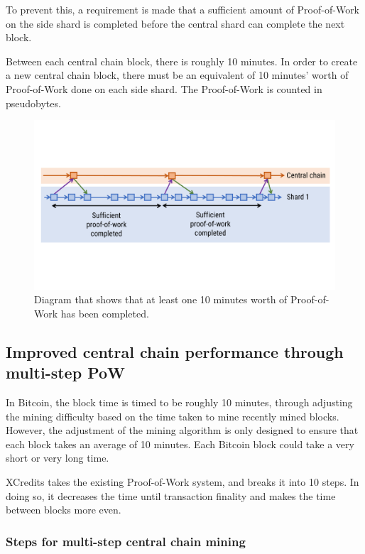 \documentclass[a4paper,12pt]{article}
\begin{document}
To prevent this, a requirement is made that a sufficient amount of Proof-of-Work on the side shard is completed before the central shard can complete the next block. 



Between each central chain block, there is roughly 10 minutes. In order to create a new central chain block, there must be an equivalent of 10 minutes' worth of Proof-of-Work done on each side shard. The Proof-of-Work is counted in pseudobytes. 

\begin{figure}[!htb]
  \centering
  \includegraphics[page=1,width=.95\textwidth]{side-shard-Proof-of-Work} 
  \caption{Diagram that shows that at least one 10 minutes worth of Proof-of-Work has been completed.}
  \label{fig:side-shard-Proof-of-Work}
\end{figure}
\FloatBarrier



\subsection{Improved central chain performance through multi-step PoW}
In Bitcoin, the block time is timed to be roughly 10 minutes, through adjusting the mining difficulty based on the time taken to mine recently mined blocks. However, the adjustment of the mining algorithm is only designed to ensure that each block takes an average of 10 minutes. Each Bitcoin block could take a very short or very long time.


XCredits takes the existing Proof-of-Work system, and breaks it into 10 steps. In doing so, it decreases the time until transaction finality and makes the time between blocks more even. 

\subsubsection{Steps for multi-step central chain mining}
\end{document}
